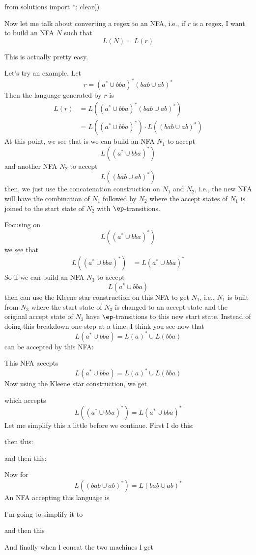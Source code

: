 \begin{python0}
from solutions import *; clear()
\end{python0}

Now let me talk about converting a regex to an NFA, i.e.,
if $r$ is a regex, I want to build an NFA $N$ such that 
\[
L(N) = L(r)
\]

This is actually pretty easy.

Let's try an example.
Let
\[
r = (a^* \cup bba)^* (bab \cup ab)^*
\]
Then the language generated by $r$ is
\begin{align*}
L(r) 
&= L((a^* \cup bba)^* (bab \cup ab)^*) \\
&= L((a^* \cup bba)^*) \cdot L((bab \cup ab)^*)
\end{align*}
At this point, we see that is we can build an NFA $N_1$ to accept
\[
L((a^* \cup bba)^*)
\]
and another NFA $N_2$ to accept
\[
L((bab \cup ab)^*)
\]
then, we just use the concatenation construction on $N_1$ and $N_2$, i.e.,
the new NFA will have the combination of $N_1$ followed by $N_2$
where the accept states of $N_1$ is joined to the start state
of $N_2$ with $\ep$-transitions.

Focusing on
\[
L((a^* \cup bba)^*)
\]
we see that
\begin{align*}
L((a^* \cup bba)^*)
&= L(a^* \cup bba)^*
\end{align*}
So if we can build an NFA $N_3$ to accept
\[
L(a^* \cup bba)
\]
then can use the Kleene star construction on this NFA to 
get $N_1$, i.e., $N_1$ is built from $N_3$ where the
start state of $N_3$ is changed to an accept state
and the original accept state of $N_3$ have $\ep$-transitions
to this new start state.
Instead of doing this breakdown one step at a time, I think you see
now that 
\[
L(a^* \cup bba)
= L(a)^* \cup L(bba)
\]
can be accepted by this NFA:

This NFA accepts 
\[
L(a^* \cup bba)
= L(a)^* \cup L(bba)
\]
Now using the Kleene star construction, we get

which accepts
\[
L((a^* \cup bba)^*) = L(a^* \cup bba)^*
\]
Let me simplify this a little before we continue.
First I do this:

then this:

and then this:


Now for 
\[
L((bab \cup ab)^* ) 
= 
L(bab \cup ab)^* 
\]
An NFA accepting this language is

I'm going to simplify it to

and then this

And finally when I concat the two machines I get



